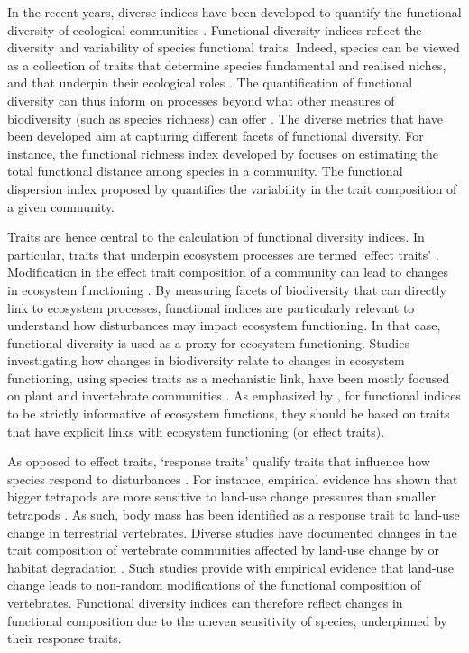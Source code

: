 In the recent years, diverse indices have been developed to quantify the functional diversity of ecological communities \citep{Schleuter2010, Legras2018, Villeger2008, Ricotta2016, Botta-Dukat2009, Laliberte2010}. Functional diversity indices reflect the diversity and variability of species functional traits. Indeed, species can be viewed as a collection of traits that determine species fundamental and realised niches, and that underpin their ecological roles \citep{Violle2007, Cadotte2011}. The quantification of functional diversity can thus inform on processes beyond what other measures of biodiversity (such as species richness) can offer \citep{Cadotte2011, Laureto2015}. The diverse metrics that have been developed aim at capturing different facets of functional diversity. For instance, the functional richness index developed by \citet{Petchey2002} focuses on estimating the total functional distance among species in a community. The functional dispersion index proposed by \citet{Laliberte2010} quantifies the variability in the trait composition of a given community. 

Traits are hence central to the calculation of functional diversity indices. In particular, traits that underpin ecosystem processes are termed `effect traits' \citep{Lavorel2002a}. Modification in the effect trait composition of a community can lead to changes in ecosystem functioning \citep{Seguin2014, DeBello2010}. By measuring facets of biodiversity that can directly link to ecosystem processes, functional indices are particularly relevant to understand how disturbances may impact ecosystem functioning. In that case, functional diversity is used as a proxy for ecosystem functioning. Studies investigating how changes in biodiversity relate to changes in ecosystem functioning, using species traits as a mechanistic link, have been mostly focused on plant and invertebrate communities \citep{Hevia2017}. As emphasized by \citet{Cadotte2011}, for functional indices to be strictly informative of ecosystem functions, they should be based on traits that have explicit links with ecosystem functioning (or effect traits).

As opposed to effect traits, `response traits' qualify traits that influence how species respond to disturbances \citep{Lavorel2002a}. For instance, empirical evidence has shown that bigger tetrapods are more sensitive to land-use change pressures than smaller tetrapods \citep{Rapacciuolo2017}. As such, body mass has been identified as a response trait to land-use change in terrestrial vertebrates. Diverse studies have documented changes in the trait composition of vertebrate communities affected by land-use change by or habitat degradation \citep{Newbold2014, Colin2018, LaSorte2018, Flynn2009, Tinoco2018}. Such studies provide with empirical evidence that land-use change leads to non-random modifications of the functional composition of vertebrates. Functional diversity indices can therefore reflect changes in functional composition due to the uneven sensitivity of species, underpinned by their response traits. 

